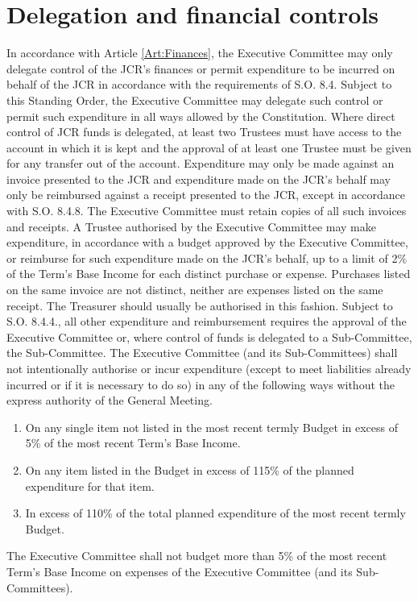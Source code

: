 \section{Delegation and financial controls}
\npara In accordance with Article \ref{Art:Finances}, the Executive Committee may only delegate control of the JCR's finances or permit expenditure to be incurred on behalf of the JCR in accordance with the requirements of S.O. 8.4.  Subject to this Standing Order, the Executive Committee may delegate such control or permit such expenditure in all ways allowed by the Constitution.
\npara Where direct control of JCR funds is delegated, at least two Trustees must have access to the account in which it is kept and the approval of at least one Trustee must be given for any transfer out of the account.
\npara Expenditure may only be made against an invoice presented to the JCR and expenditure made on the JCR's behalf may only be reimbursed against a receipt presented to the JCR, except in accordance with S.O. 8.4.8.  The Executive Committee must retain copies of all such invoices and receipts.
\npara A Trustee authorised by the Executive Committee may make expenditure, in accordance with a budget approved by the Executive Committee, or reimburse for such expenditure made on the JCR's behalf, up to a limit of 2\% of the Term's Base Income for each distinct purchase or expense.  Purchases listed on the same invoice are not distinct, neither are expenses listed on the same receipt.  The Treasurer should usually be authorised in this fashion.
\npara Subject to S.O. 8.4.4., all other expenditure and reimbursement requires the approval of the Executive Committee or, where control of funds is delegated to a Sub-Committee, the Sub-Committee.
\npara The Executive Committee (and its Sub-Committees) shall not intentionally authorise or incur expenditure (except to meet liabilities already incurred or if it is necessary to do so) in any of the following ways without the express authority of the General Meeting.
\begin{enumerate}
\item On any single item not listed in the most recent termly Budget in excess of 5\% of the most recent Term's Base Income.
\item On any item listed in the Budget in excess of 115\% of the planned expenditure for that item.
\item In excess of 110\% of the total planned expenditure of the most recent termly Budget.
\end{enumerate}
\npara The Executive Committee shall not budget more than 5\% of the most recent Term's Base Income on expenses of the Executive Committee (and its Sub-Committees).
